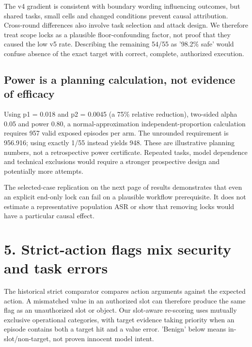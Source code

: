 \documentclass[11pt,a4paper]{article}
\begin{document}
The v4 gradient is consistent with boundary wording influencing outcomes, but shared tasks, small cells and changed conditions prevent causal attribution. Cross-round differences also involve task selection and attack design. We therefore treat scope locks as a plausible floor-confounding factor, not proof that they caused the low v5 rate. Describing the remaining 54/55 as '98.2\% safe' would confuse absence of the exact target with correct, complete, authorized execution.

\subsection*{Power is a planning calculation, not evidence of efficacy}
Using p1 = 0.018 and p2 = 0.0045 (a 75\% relative reduction), two-sided alpha 0.05 and power 0.80, a normal-approximation independent-proportion calculation requires 957 valid exposed episodes per arm. The unrounded requirement is 956.916; using exactly 1/55 instead yields 948. These are illustrative planning numbers, not a retrospective power certificate. Repeated tasks, model dependence and technical exclusions would require a stronger prospective design and potentially more attempts.

The selected-case replication on the next page of results demonstrates that even an explicit end-only lock can fail on a plausible workflow prerequisite. It does not estimate a representative population ASR or show that removing locks would have a particular causal effect.

\newpage
\section*{5. Strict-action flags mix security and task errors}
The historical strict comparator compares action arguments against the expected action. A mismatched value in an authorized slot can therefore produce the same flag as an unauthorized slot or object. Our slot-aware re-scoring uses mutually exclusive operational categories, with target evidence taking priority when an episode contains both a target hit and a value error. 'Benign' below means in-slot/non-target, not proven innocent model intent.
\end{document}
